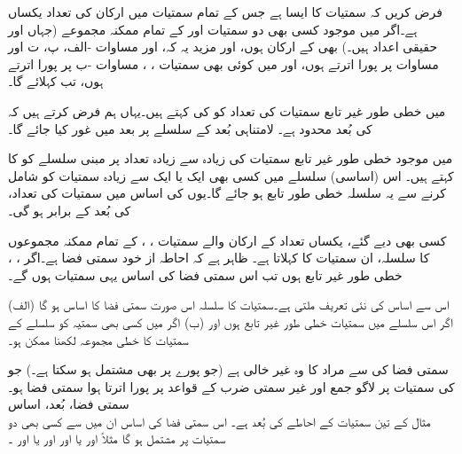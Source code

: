 فرض کریں کہ  سمتیات کا ایسا  ہے جس کے تمام سمتیات میں ارکان کی تعداد یکساں ہے۔اگر  میں موجود  کسی بھی دو سمتیات  اور   کے تمام ممکنہ مجموعے  (جہاں  اور  حقیقی اعداد ہیں۔) بھی  کے ارکان ہوں، اور مزید یہ کہ،  اور  مساوات -الف، پ، ت اور مساوات  پر پورا اترتے ہوں، اور  میں کوئی بھی سمتیات ، ،  مساوات -ب پر پورا اترتے ہوں، تب   کہلائے گا۔

 میں خطی طور غیر تابع سمتیات کی تعداد کو  کی  کہتے ہیں۔یہاں ہم فرض کرتے ہیں کہ  کی بُعد محدود ہے۔ لامتناہی بُعد کے سلسلے پر بعد میں غور کیا جائے گا۔

 میں موجود خطی طور غیر تابع سمتیات کی زیادہ سے زیادہ تعداد پر مبنی سلسلے کو  کا  کہتے ہیں۔  اس (اساسی) سلسلے میں کسی بھی ایک یا ایک سے زیادہ سمتیات کو شامل کرنے سے یہ سلسلہ خطی طور تابع ہو جائے گا۔یوں  کی اساس میں سمتیات کی تعداد،  کی بُعد کے برابر ہو گی۔

کسی بھی دیے گئے، یکساں تعداد کے ارکان والے سمتیات ، ، کے تمام ممکنہ مجموعوں کا سلسلہ،  ان سمتیات کا  کہلاتا ہے۔ ظاہر ہے کہ احاطہ از خود سمتی فضا ہے۔اگر  ، ، خطی طور غیر تابع ہوں تب اس سمتی فضا کی اساس یہی سمتیات ہوں گے۔

اس سے اساس کی نئی تعریف ملتی ہے۔سمتیات کا سلسلہ اس صورت سمتی فضا  کا اساس ہو گا  (الف) اگر اس سلسلے میں سمتیات خطی طور غیر تابع ہوں اور (ب) اگر  میں کسی بھی سمتیہ کو سلسلے کے سمتیات کا خطی مجموعہ لکھنا ممکن ہو۔

سمتی فضا کی  سے مراد  کا وہ غیر خالی  ہے (جو پورے  پر بھی مشتمل ہو سکتا ہے۔) جو  کی سمتیات پر لاگو جمع اور غیر سمتی ضرب کے قواعد پر پورا اترتا ہوا سمتی فضا ہو۔
\quad سمتی فضا، بُعد، اساس\\
مثال  کے تین سمتیات کے احاطے کی بُعد  ہے۔ اس سمتی فضا کی اساس ان میں سے کسی بھی دو سمتیات پر مشتمل ہو گا مثلاً  اور  یا  اور  اور یا  اور ۔

